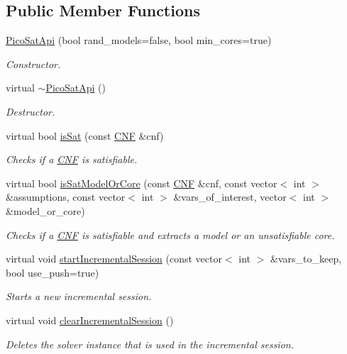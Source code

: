 \subsection*{Public Member Functions}
\begin{DoxyCompactItemize}
\item 
\hyperlink{classPicoSatApi_a8d9525989ce86f149019a16a9ab665da}{Pico\-Sat\-Api} (bool rand\-\_\-models=false, bool min\-\_\-cores=true)
\begin{DoxyCompactList}\small\item\em Constructor. \end{DoxyCompactList}\item 
virtual \hyperlink{classPicoSatApi_aca9cd62b969f2d1dac2190962ecfb910}{$\sim$\-Pico\-Sat\-Api} ()
\begin{DoxyCompactList}\small\item\em Destructor. \end{DoxyCompactList}\item 
virtual bool \hyperlink{classPicoSatApi_a46ea721c61e298d87403476607ba9fe6}{is\-Sat} (const \hyperlink{classCNF}{C\-N\-F} \&cnf)
\begin{DoxyCompactList}\small\item\em Checks if a \hyperlink{classCNF}{C\-N\-F} is satisfiable. \end{DoxyCompactList}\item 
virtual bool \hyperlink{classPicoSatApi_a00dda1bd348d46bbfbf506f7735946da}{is\-Sat\-Model\-Or\-Core} (const \hyperlink{classCNF}{C\-N\-F} \&cnf, const vector$<$ int $>$ \&assumptions, const vector$<$ int $>$ \&vars\-\_\-of\-\_\-interest, vector$<$ int $>$ \&model\-\_\-or\-\_\-core)
\begin{DoxyCompactList}\small\item\em Checks if a \hyperlink{classCNF}{C\-N\-F} is satisfiable and extracts a model or an unsatisfiable core. \end{DoxyCompactList}\item 
virtual void \hyperlink{classPicoSatApi_a5e32634944d14142ab0e2c4fdeb12d85}{start\-Incremental\-Session} (const vector$<$ int $>$ \&vars\-\_\-to\-\_\-keep, bool use\-\_\-push=true)
\begin{DoxyCompactList}\small\item\em Starts a new incremental session. \end{DoxyCompactList}\item 
virtual void \hyperlink{classPicoSatApi_ae53598723725fd3203e2e32411392dab}{clear\-Incremental\-Session} ()
\begin{DoxyCompactList}\small\item\em Deletes the solver instance that is used in the incremental session. \end{DoxyCompactList}\item 

\end{DoxyCompactItemize}

